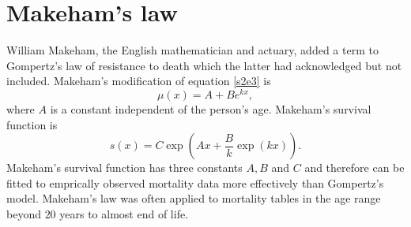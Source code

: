 \documentclass{article}
\numberwithin{equation}{section}
\begin{document}
\section{Makeham's law}\label{s3}
William Makeham, the English mathematician and actuary, added a term to
Gompertz's law of resistance to death which the latter had acknowledged but
not included. Makeham's modification \cite{makeham1867law} of equation 
\eqref{s2e3} is
\begin{equation}\label{s3e1}
\mu(x) = A + Be^{kx},
\end{equation}
where $A$ is a constant independent of the person's age. Makeham's survival
function is
\begin{equation}\label{s3e2}
s(x) = C\exp\left(Ax + \frac{B}{k}\exp(kx)\right).
\end{equation}
Makeham's survival function has three constants $A, B$ and $C$ and therefore
can be fitted to emprically observed mortality data more effectively than
Gompertz's model. Makeham's law was often applied to mortality tables in the
age range beyond $20$ years to almost end of life\cite{jordan1967society}.


\end{document}
